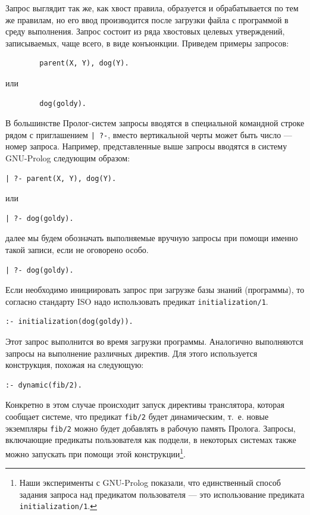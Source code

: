 \documentclass[12pt, openany, twoside]{book} %
\begin{document}
Запрос выглядит так же, как хвост правила, образуется и обрабатывается по тем же правилам, но его ввод производится после загрузки файла с программой в среду выполнения. Запрос состоит из ряда хвостовых целевых утверждений, записываемых, чаще всего, в виде конъюнкции. Приведем примеры запросов:
{\tt\begin{verbatim}
        parent(X, Y), dog(Y).
\end{verbatim}}
\noindent или
{\tt\begin{verbatim}
        dog(goldy).
\end{verbatim}}
В большинстве Пролог-систем запросы вводятся в специальной командной строке рядом с приглашением \texttt{| ?-}, вместо вертикальной черты может быть число --- номер запроса. Например, представленные выше запросы вводятся в систему GNU-Prolog следующим образом:
{\tt\begin{verbatim}
| ?- parent(X, Y), dog(Y).
\end{verbatim}}
\noindent или
{\tt\begin{verbatim}
| ?- dog(goldy).
\end{verbatim}}
далее мы будем обозначать выполняемые вручную запросы при помощи именно такой записи, если не оговорено особо.
{\tt\begin{verbatim}
| ?- dog(goldy).
\end{verbatim}}

Если необходимо инициировать запрос при загрузке базы знаний (программы), то согласно стандарту ISO надо использовать предикат \texttt{initialization/1}.
{\tt\begin{verbatim}
:- initialization(dog(goldy)).
\end{verbatim}}
Этот запрос выполнится во время загрузки программы. Аналогично выполняются запросы на выполнение различных директив. Для этого используется конструкция, похожая на следующую:
{\tt\begin{verbatim}
:- dynamic(fib/2).
\end{verbatim}}
Конкретно в этом случае происходит запуск директивы транслятора, которая сообщает системе, что предикат \texttt{fib/2} будет динамическим, т.~е. новые экземпляры \texttt{fib/2} можно будет добавлять в рабочую память Пролога. Запросы, включающие предикаты пользователя как подцели, в некоторых системах также можно запускать при помощи этой конструкции\footnote{Наши эксперименты с GNU-Prolog показали, что единственный способ задания запроса над предикатом пользователя --- это использование предиката \texttt{initialization/1}.}.
\end{document}
